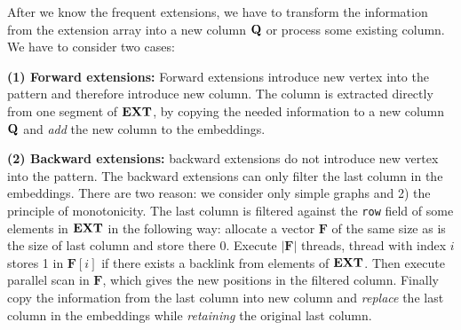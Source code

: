 After we know the frequent extensions, we have to transform the
information from the extension array into a new column $\mathbf{Q}$ or
process some existing column. We have to consider two cases:

\textbf{(1) Forward extensions: } Forward extensions introduce new
vertex into the pattern and therefore introduce new column. The column
is extracted directly from one segment of $\mathbf{EXT}$, by
copying the needed information to a new column $\mathbf{Q}$ and
\emph{add} the new column to the embeddings.


\textbf{(2) Backward extensions: } backward extensions do not
introduce new vertex into the pattern. The backward extensions can
only filter the last column in the embeddings. There are two reason:
we consider only simple graphs and 2) the principle of
monotonicity. The last column is filtered against the \texttt{row}
field of some elements in $\mathbf{EXT}$ in the following way:
allocate a vector $\mathbf{F}$ of the same size as is the size of last
column and store there 0. Execute $|\mathbf{F}|$ threads, thread with
index $i$ stores 1 in $\mathbf{F}[i]$ if there exists a backlink from
elements of $\mathbf{EXT}$. Then execute parallel scan in
$\mathbf{F}$, which gives the new positions in the filtered
column. Finally copy the information from the last column into new
column and \emph{replace} the last column in the embeddings while
\emph{retaining} the original last column.



